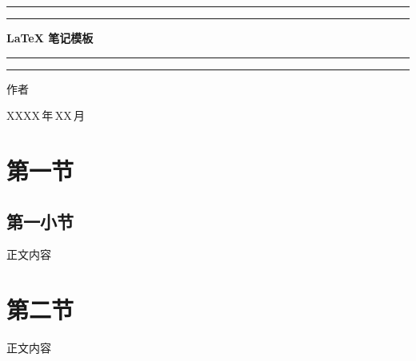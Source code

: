 \documentclass[cn,normal,11pt,blue]{elegantnote}
\numberwithin{equation}{section}
\begin{document}


\begin{titlepage}
    \centering   %
    \vspace*{5\baselineskip}   %
    \color{ecolor}

    \rule{\textwidth}{1.6pt}\vspace*{-\baselineskip}\vspace*{2pt}  %
    \rule{\textwidth}{0.4pt}   %
	
    \vspace{0.75\baselineskip} %

    {%
    \bfseries \LaTeX{} 笔记模板   %
    }

	\vspace{0.75\baselineskip} %
	
	\rule{\textwidth}{0.4pt}\vspace*{-\baselineskip}\vspace{3.2pt} %
	\rule{\textwidth}{1.6pt}  %
	
	\vspace{4\baselineskip}   %

    {\fangsong\Large 作者 \\[10pt] }
	
    {\fangsong\Large XXXX\,年\,XX\,月 \\}
	\vfill
\end{titlepage}


\clearpage


\tableofcontents
\clearpage
{}





\section{第一节}

\subsection{第一小节}
正文内容

\section{第二节}

正文内容
\end{document}
